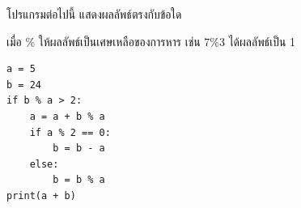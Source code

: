 \question โปรแกรมต่อไปนี้ แสดงผลลัพธ์ตรงกับข้อใด

เมื่อ \% ให้ผลลัพธ์เป็นเศษเหลือของการหาร เช่น 7\%3 ได้ผลลัพธ์เป็น 1
\begin{verbatim}
a = 5
b = 24
if b % a > 2:
    a = a + b % a
    if a % 2 == 0:
        b = b - a
    else:
        b = b % a
print(a + b)
\end{verbatim}
